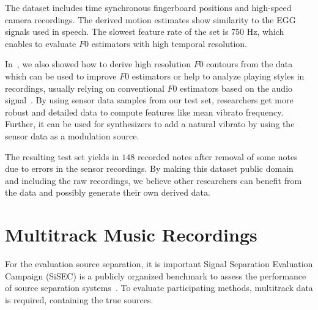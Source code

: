 \par
The dataset includes time synchronous fingerboard positions and high-speed camera recordings. 
The derived motion estimates show similarity to the EGG signals used in speech. 
The slowest feature rate of the set is 750 Hz, which enables to evaluate $F0$ estimators with high temporal resolution. 
\par
In~\cite{stoeter15acm}, we also showed how to derive high resolution $F0$ contours from the data which can be used to improve $F0$ estimators or help to analyze playing styles in recordings, usually relying on conventional $F0$ estimators based on the audio signal~\cite{mellody2000time}. 
By using sensor data samples from our test set, researchers get more robust and detailed data to compute features like mean vibrato frequency. 
Further, it can be used for synthesizers to add a natural vibrato by using the sensor data as a modulation source.
\par
The resulting test set yields in $148$ recorded notes after removal of some notes due to errors in the sensor recordings.
By making this dataset public domain~\cite{oss_muserc} and including the raw recordings, we believe other researchers can benefit from the data and possibly generate their own derived data.

\section{Multitrack Music Recordings}%
\label{sec:multitrack}

For the evaluation source separation, it is important 
 Signal Separation Evaluation Campaign (SiSEC) is a publicly organized benchmark to assess the performance of source separation systems~\cite{sisec13, ono15, liutkus17, stoeter18sisec}.
To evaluate participating methods, multitrack data is required, containing the true sources.

